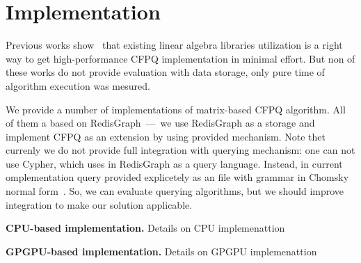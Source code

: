 \section{Implementation}

Previous works show~\cite{Mishin:2019:ECP:3327964.3328503, Azimov:2018:CPQ:3210259.3210264} that existing linear algebra libraries utilization is a right way to get high-performance CFPQ implementation in minimal effort.
But non of these works do not provide evaluation with data storage, only pure time of algorithm execution was mesured. 

We provide a number of implementations of matrix-based CFPQ algorithm.
All of them a based on RedisGraph~---~we use RedisGraph as a storage and implement CFPQ as an extension by using provided mechanism.
Note thet currenly we do not provide full integration with querying mechanism: one can not use Cypher, which uses in RedisGraph as a query language.
Instead, in current omplementation query provided explicetely as an file with grammar in Chomsky normal form~\cite{!!!}.
So, we can evaluate querying algorithms, but we should improve integration to make our solution applicable.
 
\textbf{CPU-based implementation.}
Details on CPU implemenattion

\textbf{GPGPU-based implementation.}
Details on GPGPU implemenattion

